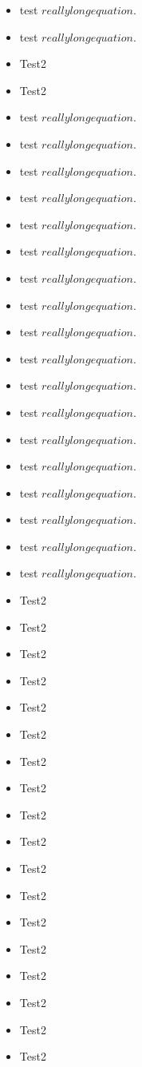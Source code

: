 \begin{itemize}
	\item test $really long equation$.
	\item test $really long equation$.
	\item Test2

	\item Test2

	\item test $really long equation$.
	\item test $really long equation$.
	\item test $really long equation$.
	\item test $really long equation$.
	\item test $really long equation$.
	\item test $really long equation$.
	\item test $really long equation$.
	\item test $really long equation$.
	\item test $really long equation$.
	\item test $really long equation$.
	\item test $really long equation$.
	\item test $really long equation$.
	\item test $really long equation$.
	\item test $really long equation$.
	\item test $really long equation$.
	\item test $really long equation$.
	\item test $really long equation$.
	\item test $really long equation$.
	\item Test2

	\item Test2

	\item Test2

	\item Test2

	\item Test2

	\item Test2

	\item Test2

	\item Test2

	\item Test2

	\item Test2

	\item Test2

	\item Test2

	\item Test2

	\item Test2

	\item Test2

	\item Test2

	\item Test2

	\item Test2
\end{itemize}

